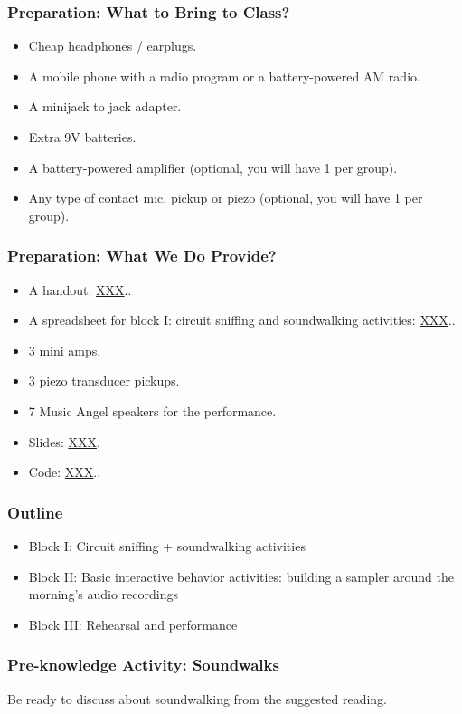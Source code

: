 \documentclass[screen, aspectratio=43]{beamer}
\begin{document}
\begin{frame}
  \frametitle{Preparation: What to Bring to Class?}
        \begin{itemize}
        \item Cheap headphones / earplugs.
        \item A mobile phone with a radio program or a battery-powered AM radio.
        \item A minijack to jack adapter.
        \item Extra 9V batteries.
        \item A battery-powered amplifier (optional, you will have 1 per group).
        \item Any type of contact mic, pickup or piezo (optional, you will have 1 per group).
         \end{itemize}
\end{frame}
%
\begin{frame}
  \frametitle{Preparation: What We Do Provide?}
        \begin{itemize}
        \item A handout: \url{XXX}..
        \item A spreadsheet for block I: circuit sniffing and soundwalking activities: \url{XXX}..
        \item 3 mini amps.
        \item 3 piezo transducer pickups.
        \item 7 Music Angel speakers for the performance.
        \item Slides: \url{XXX}.
        \item Code: \url{XXX}..
         \end{itemize}
\end{frame}
%
\begin{frame}
  \frametitle{Outline}
      \begin{itemize}
	\item Block I: Circuit sniffing + soundwalking activities
	\item Block II: Basic interactive behavior activities: building a sampler around the morning's audio recordings
	\item Block III: Rehearsal and performance
    \end{itemize}  
\end{frame}
%
\begin{frame}
  \frametitle{Pre-knowledge Activity: Soundwalks}
  Be ready to discuss about soundwalking from the suggested reading.
\end{frame}
\end{document}
